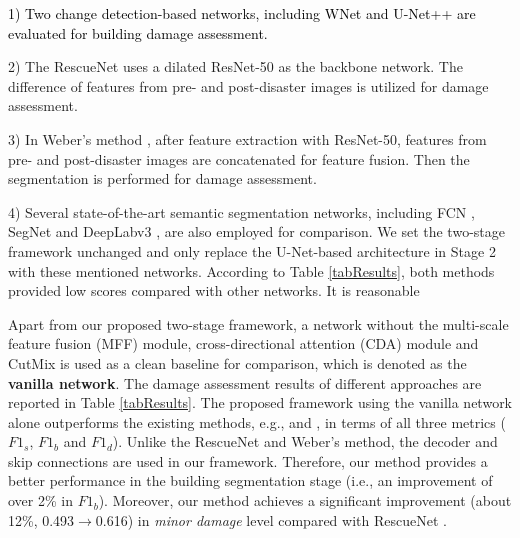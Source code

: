\documentclass[journal]{IEEEtran}
\begin{document}
\textcolor{black}{
1) Two change detection-based networks, including WNet \cite{houWNetCDGANBitemporal2020} and U-Net++ \cite{pengEndtoEndChangeDetection2019} are evaluated for building damage assessment.}

2) The RescueNet \cite{gupta2020rescuenet} uses a dilated ResNet-50 as the backbone network. The difference of features from pre- and post-disaster images is utilized for damage assessment.

3) In Weber's method \cite{weber2020building}, after feature extraction with ResNet-50, features from pre- and post-disaster images are concatenated for feature fusion. Then the segmentation is performed for damage assessment.

4) Several state-of-the-art semantic segmentation networks, including FCN \cite{Long_2015_CVPR}, SegNet \cite{badrinarayananSegNetDeepConvolutional2017} and DeepLabv3 \cite{chen2017rethinking}, are also employed for comparison. We set the two-stage framework unchanged and only replace the U-Net-based architecture in Stage 2 with these mentioned networks. According to Table \ref{tabResults}, both methods provided low scores  compared with other networks. It is reasonable 

Apart from our proposed two-stage framework, a network without the multi-scale feature fusion (MFF) module, cross-directional attention (CDA) module and CutMix is used as a clean baseline for comparison, which is denoted as the \textbf{vanilla network}. The damage assessment results of different approaches are reported in Table \ref{tabResults}. The proposed framework using the vanilla network alone outperforms the existing methods, e.g., \cite{gupta2020rescuenet} and \cite{weber2020building}, in terms of all three metrics ($F1_s$, $F1_b$ and $F1_d$). Unlike the RescueNet and Weber's method, the decoder and skip connections are used in  our framework. Therefore, our method provides a better performance in the building segmentation stage (i.e., an improvement of over 2\% in $F1_b$). 
Moreover, our method achieves a significant improvement (about 12\%, 0.493$\rightarrow$0.616) in \textit{minor damage} level compared with RescueNet \cite{gupta2020rescuenet}. 
\end{document}
